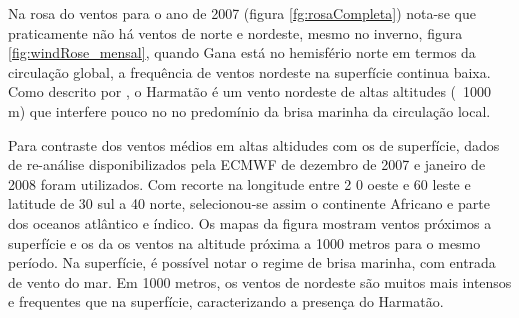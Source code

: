 Na rosa do ventos para o ano de 2007 (figura \ref{fg:rosaCompleta}) nota-se 
que praticamente não há ventos de norte e nordeste, mesmo no inverno, 
figura \ref{fig:windRose_mensal}, quando Gana está no hemisfério norte em 
termos da circulação global, a frequência de ventos nordeste na superfície 
continua baixa. Como descrito por \citet{breuning2005}, o Harmatão
é um vento nordeste de altas altitudes (~1000 m) que interfere pouco no
no predomínio da brisa marinha da circulação local.  

Para contraste dos ventos médios em altas altidudes com os de superfície, 
dados de re-análise disponibilizados pela ECMWF de dezembro de 
2007 e janeiro de 2008 foram utilizados. Com recorte na longitude entre 2
0 oeste e 60 leste e latitude de 30 sul a 40 norte, selecionou-se assim o 
continente Africano e parte dos oceanos atlântico e índico. 
Os mapas da figura \label{fig:ECMWF10} mostram
ventos próximos a superfície e os da \label{fig:ECMWF1000} os ventos na altitude 
próxima a 1000 metros para o mesmo período. 
Na superfície, é possível notar o regime de brisa marinha, com entrada de vento 
do mar. Em 1000 metros, os ventos de nordeste são muitos mais intensos e 
frequentes que na superfície, caracterizando a presença do Harmatão. 
